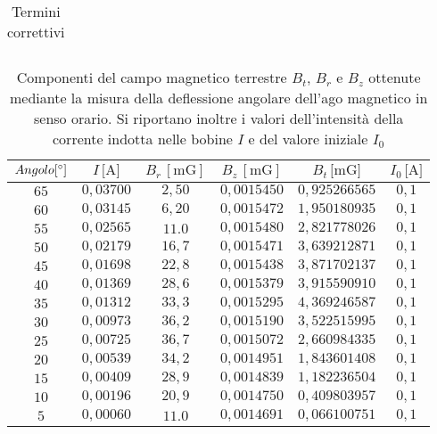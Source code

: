 \documentclass[]{article}
\begin{document}
\begin{table}
\begin{tabular}{||c|c||}
\end{tabular}
\caption{Termini correttivi}
\label{termine_correttivo}
\end{table}


\begin{table}
    \centering


\begin{tabular}{||c|c|c|c|c|c||}
    \hline
    $Angolo [\text{\degree}] $ & $I\, \text{[A]} $ & $B_r\, [\text{mG}] $ & $B_z\, [\text{mG}] $ & $B_t\, \text{[mG]} $ & $I_0\, \text{[A]} $\\
    \hline\hline



    $65$ & $0,03700$ & $2,50$ & $0,0015450$ & $0,925266565$ & $0,1$ \\\hline
    $60$ & $0,03145$ & $6,20$ & $0,0015472$ & $1,950180935$ & $0,1$ \\\hline
    $55$ & $0,02565$ & $11.0$ & $0,0015480$ & $2,821778026$ & $0,1$ \\\hline
    $50$ & $0,02179$ & $16,7$ & $0,0015471$ & $3,639212871$ & $0,1$ \\\hline
    $45$ & $0,01698$ & $22,8$ & $0,0015438$ & $3,871702137$ & $0,1$ \\\hline
    $40$ & $0,01369$ & $28,6$ & $0,0015379$ & $3,915590910$ & $0,1$ \\\hline
    $35$ & $0,01312$ & $33,3$ & $0,0015295$ & $4,369246587$ & $0,1$ \\\hline
    $30$ & $0,00973$ & $36,2$ & $0,0015190$ & $3,522515995$ & $0,1$ \\\hline
    $25$ & $0,00725$ & $36,7$ & $0,0015072$ & $2,660984335$ & $0,1$ \\\hline
    $20$ & $0,00539$ & $34,2$ & $0,0014951$ & $1,843601408$ & $0,1$ \\\hline
    $15$ & $0,00409$ & $28,9$ & $0,0014839$ & $1,182236504$ & $0,1$ \\\hline
    $10$ & $0,00196$ & $20,9$ & $0,0014750$ & $0,409803957$ & $0,1$ \\\hline
    $5 $ & $0,00060$ & $11.0$ & $0,0014691$ & $0,066100751$ & $0,1$ \\\hline

\end{tabular}
\caption{Componenti del campo magnetico terrestre $B_t$, $B_r$ e $B_z$ ottenute mediante la misura della deflessione angolare dell'ago magnetico in senso orario. Si riportano inoltre i valori dell'intensità della corrente indotta nelle bobine $I$ e del valore iniziale $I_0$}
\label{campomagneticoterrestre_sensoorario}
\end{table}
\end{document}
